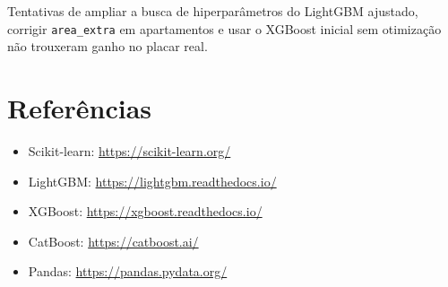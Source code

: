 \documentclass[12pt,a4paper]{article}
\begin{document}
Tentativas de ampliar a busca de hiperparâmetros do LightGBM ajustado, corrigir \texttt{area\_extra} em apartamentos e usar o XGBoost inicial sem otimização não trouxeram ganho no placar real.

\section{Referências}

\begin{itemize}
  \item Scikit-learn: \url{https://scikit-learn.org/}
  \item LightGBM: \url{https://lightgbm.readthedocs.io/}
  \item XGBoost: \url{https://xgboost.readthedocs.io/}
  \item CatBoost: \url{https://catboost.ai/}
  \item Pandas: \url{https://pandas.pydata.org/}
\end{itemize}
\end{document}
